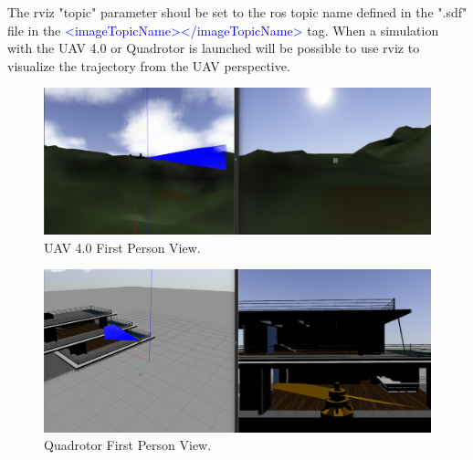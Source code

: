 		The rviz "topic" parameter shoul be set to the ros topic name defined in the ".sdf" file in the \textcolor{blue}{<imageTopicName></imageTopicName>} tag.
		When a simulation with the UAV 4.0 or Quadrotor is launched will be possible to use rviz to visualize the trajectory from the UAV perspective. 
		
		
		\begin{figure}[!ht]
			\centering
			\includegraphics[width=450pt]{figuras/camerav4.png}
			\caption{UAV 4.0 First Person View.}
			\label{v4camera}
		\end{figure}
		
		\begin{figure}[!ht]
			\centering
			\includegraphics[width=450pt]{figuras/quadcam.png}
			\caption{Quadrotor First Person View.}
			\label{quadamera}
		\end{figure}





